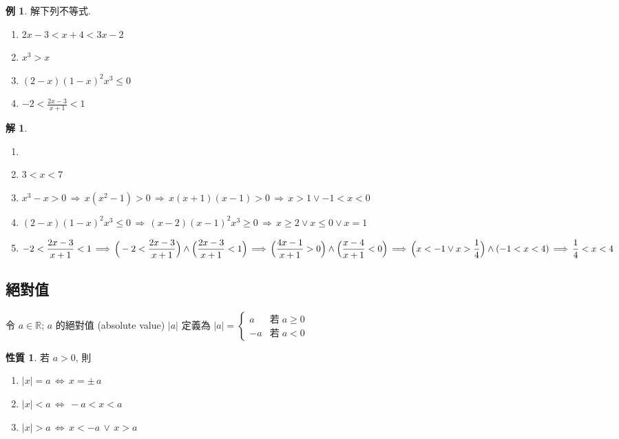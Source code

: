 \documentclass[12pt]{extarticle}
\newcommand{\ds}{\displaystyle}
\newcommand{\ie}{\,\Longrightarrow\,}
\newcommand{\ifff}{\,\Longleftrightarrow\,}
\theoremstyle{definition}
\newtheorem*{prp}{性質}
\newtheorem*{ex}{例}
\newtheorem*{sol}{解}
\newcommand{\myline}{\noindent\makebox[\linewidth]{\rule{\paperwidth}{0.4pt}}}
\begin{document}
\begin{ex}
  解下列不等式. 
  \setlength{\columnsep}{-20mm}
  \begin{multicols}{2}
    \begin{enumerate}\setlength\itemsep{0em}
      \item $\ds 2x - 3 < x + 4 < 3 x - 2$
      \item $\ds x^3 > x$
      \item $\ds (2 - x)(1 - x)^2 x^3 \leqslant 0$
      \item $\ds -2 < \frac{2x - 3}{x + 1} < 1$
    \end{enumerate}
  \end{multicols}
\end{ex}

\begin{sol}
  \begin{enumerate}\setlength\itemsep{0em}
    \item[]
    \item $\ds 3 < x < 7$
    \item $\ds x^3 - x > 0 \ie x(x^2 - 1) > 0 \ie x(x + 1)(x - 1) > 0 \ie x > 1 \vee -1 < x < 0$
    \item $\ds (2 - x)(1 - x)^2 x^3 \leqslant 0 \ie (x - 2)(x - 1)^2 x^3 \geqslant 0 \ie x\geqslant 2 \vee x\leqslant 0\vee x = 1$
    \item $\ds -2 < \frac{2x - 3}{x + 1} < 1 \ie \Big(-2 < \frac{2x - 3}{x + 1}\Big)\wedge\Big(\frac {2x - 3}{x + 1} < 1\Big) \ie \Big(\frac{4x - 1}{x + 1} > 0\Big) \wedge \Big(\frac{x - 4}{x + 1} < 0\Big) \\ \ie \Big(x < -1 \vee x > \frac{1}{4}\Big) \wedge (-1 < x < 4) \ie \frac{1}{4} < x < 4$
  \end{enumerate}
\end{sol}

\myline

\subsection*{絕對值}
令 $a\in\mathbb{R}$;  $a$ 的絕對值 (absolute value) $|a|$ 定義為 $\ds|a|=\begin{cases} a & \text{若}\;a\geqslant 0 \\ - a&\text{若}\;a < 0\end{cases}$

\begin{prp}
  若 $a > 0$, 則
  \setlength{\columnsep}{-20mm}
  \begin{multicols}{3}
    \begin{enumerate}\setlength\itemsep{0em}
      \item $\ds |x| = a \ifff x = \pm\,a$
      \item $\ds |x| < a \ifff -a < x < a$
      \item $\ds |x| > a \ifff x < -a \,\vee\, x > a$
    \end{enumerate}
  \end{multicols}
\end{prp}
\end{document}
